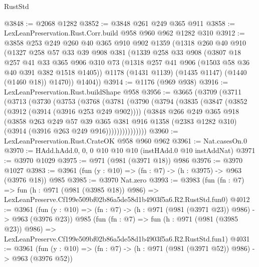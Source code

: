 \begin{lexlean}{RustStd}
\begin{coremodule}
@3848 := @2068 @1282
@3852 := @3848 @261 @249 @365 @911
@3858 := LexLeanPreservation.Rust.Corr.build @958 @960 @962 @1282 @310
@3912 := @3858
    @253
    @249
    @260
    @40
    @365
    @910
    @902
    @1359
    (@1318
      @260
      @40
      @910
      (@1327
        @258
        @57
        @33
        @39
        @908
        @381
        (@1339
          @258
          @33
          @908
          (@3807
            @18
            @257
            @41
            @33
            @365
            @906
            @310
            @73
            (@1318 @257 @41 @906 (@1503 @58 @36 @40 @391 @382 @1518 @1405))
            @1178
            (@1431 @1139)
            (@1435 @1147)
            (@1440 (@1460 @18))
            @1470))
        @1404))
@3914 := @1176 (@969 @938)
@3916 := LexLeanPreservation.Rust.buildShape @958
@3956 := @3665
    (@3709
      (@3711
        (@3713
          (@3730
            (@3753
              (@3768
                (@3781
                  (@3790
                    (@3794
                      (@3835
                        (@3847
                          (@3852 (@3912 (@3914 (@3916 @253 @249 @902))))
                          (@3848
                            @266
                            @249
                            @365
                            @918
                            (@3858
                              @263
                              @249
                              @57
                              @39
                              @365
                              @381
                              @916
                              @1358
                              (@2383 @1282 @310)
                              (@3914 (@3916 @263 @249 @916)))))))))))))))
@3960 := LexLeanPreservation.Rust.CrateOK @958 @960 @962
@3961 := Nat.casesOn.{0}
@3970 := HAdd.hAdd.{0, 0, 0} @10 @10 @10 (instHAdd.{0} @10 instAddNat)
@3971 := @3970 @1029
@3975 := @971 (@981 (@3971 @18)) @986
@3976 := @3970 @1027
@3983 := @3961 (fun (y : @10) => (fn : @7) -> (h : @3975) -> @963 (@3976 @18)) @985
@3985 := @3970 Nat.zero
@3993 := @3983
    (fun (fn : @7) =>
    fun (h : @971 (@981 (@3985 @18)) @986) =>
    LexLeanPreserve.Cf199e509bf02b86a5de58d1b4903f5a6.R2.RustStd.fun0)
@4012 := @3961
    (fun (y : @10) => (fn : @7) -> (h : @971 (@981 (@3971 @23)) @986) -> @963 (@3976 @23))
    @985
    (fun (fn : @7) =>
    fun (h : @971 (@981 (@3985 @23)) @986) =>
    LexLeanPreserve.Cf199e509bf02b86a5de58d1b4903f5a6.R2.RustStd.fun1)
@4031 := @3961
    (fun (y : @10) => (fn : @7) -> (h : @971 (@981 (@3971 @52)) @986) -> @963 (@3976 @52))

\end{coremodule}
\end{lexlean}
